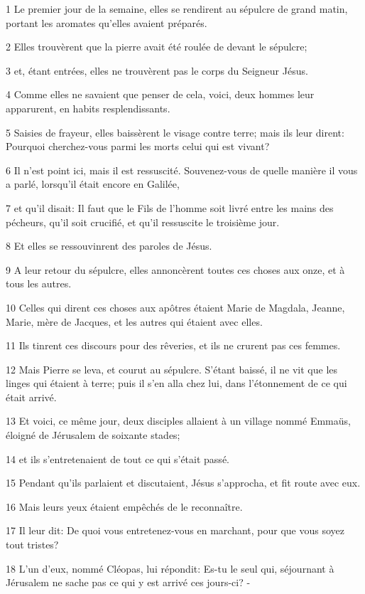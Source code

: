 \par 1 Le premier jour de la semaine, elles se rendirent au sépulcre de grand matin, portant les aromates qu'elles avaient préparés.
\par 2 Elles trouvèrent que la pierre avait été roulée de devant le sépulcre;
\par 3 et, étant entrées, elles ne trouvèrent pas le corps du Seigneur Jésus.
\par 4 Comme elles ne savaient que penser de cela, voici, deux hommes leur apparurent, en habits resplendissants.
\par 5 Saisies de frayeur, elles baissèrent le visage contre terre; mais ils leur dirent: Pourquoi cherchez-vous parmi les morts celui qui est vivant?
\par 6 Il n'est point ici, mais il est ressuscité. Souvenez-vous de quelle manière il vous a parlé, lorsqu'il était encore en Galilée,
\par 7 et qu'il disait: Il faut que le Fils de l'homme soit livré entre les mains des pécheurs, qu'il soit crucifié, et qu'il ressuscite le troisième jour.
\par 8 Et elles se ressouvinrent des paroles de Jésus.
\par 9 A leur retour du sépulcre, elles annoncèrent toutes ces choses aux onze, et à tous les autres.
\par 10 Celles qui dirent ces choses aux apôtres étaient Marie de Magdala, Jeanne, Marie, mère de Jacques, et les autres qui étaient avec elles.
\par 11 Ils tinrent ces discours pour des rêveries, et ils ne crurent pas ces femmes.
\par 12 Mais Pierre se leva, et courut au sépulcre. S'étant baissé, il ne vit que les linges qui étaient à terre; puis il s'en alla chez lui, dans l'étonnement de ce qui était arrivé.
\par 13 Et voici, ce même jour, deux disciples allaient à un village nommé Emmaüs, éloigné de Jérusalem de soixante stades;
\par 14 et ils s'entretenaient de tout ce qui s'était passé.
\par 15 Pendant qu'ils parlaient et discutaient, Jésus s'approcha, et fit route avec eux.
\par 16 Mais leurs yeux étaient empêchés de le reconnaître.
\par 17 Il leur dit: De quoi vous entretenez-vous en marchant, pour que vous soyez tout tristes?
\par 18 L'un d'eux, nommé Cléopas, lui répondit: Es-tu le seul qui, séjournant à Jérusalem ne sache pas ce qui y est arrivé ces jours-ci? -
